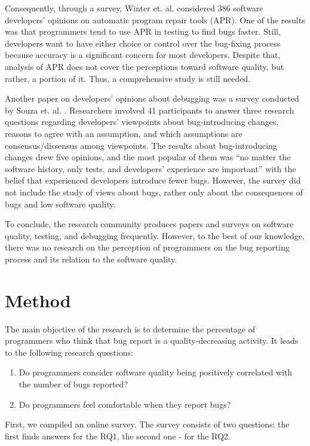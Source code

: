 \documentclass[11pt,review,sigplan,nonacm,natbib=false]{acmart}
\begin{document}
Consequently, through a survey, Winter et. al. \cite{APR} considered 386 software developers’ opinions on automatic program repair tools (APR). One of the results was that programmers tend to use APR in testing to find bugs faster. Still, developers want to have either choice or control over the bug-fixing process because accuracy is a significant concern for most developers. Despite that, analysis of APR does not cover the perceptions toward software quality, but rather, a portion of it. Thus, a comprehensive study is still needed.

Another paper on developers’ opinions about debugging was a survey conducted by Souza et. al. \cite{BugChanges}. Researchers involved 41 participants to answer three research questions regarding developers’ viewpoints about bug-introducing changes, reasons to agree with an assumption, and which assumptions are consensus/dissensus among viewpoints. The results about bug-introducing changes drew five opinions, and the most popular of them was “no matter the software history, only tests, and developers’ experience are important” with the belief that experienced developers introduce fewer bugs. However, the survey did not include the study of views about bugs, rather only about the consequences of bugs and low software quality.

To conclude, the research community produces papers and surveys on software quality, testing, and debugging frequently. However, to the best of our knowledge, there was no research on the perception of programmers on the bug reporting process and its relation to the software quality.

\section{Method}

The main objective of the research is to determine the percentage of programmers who think that bug report is a quality-decreasing activity. It leads to the following research questions:
\begin{enumerate}
  \item Do programmers consider software quality being positively correlated with the number of bugs reported?
  \item Do programmers feel comfortable when they report bugs?
\end{enumerate}

First, we compiled an online survey. The survey consists of two questions: the first finds answers for the RQ1, the second one - for the RQ2.
\end{document}
